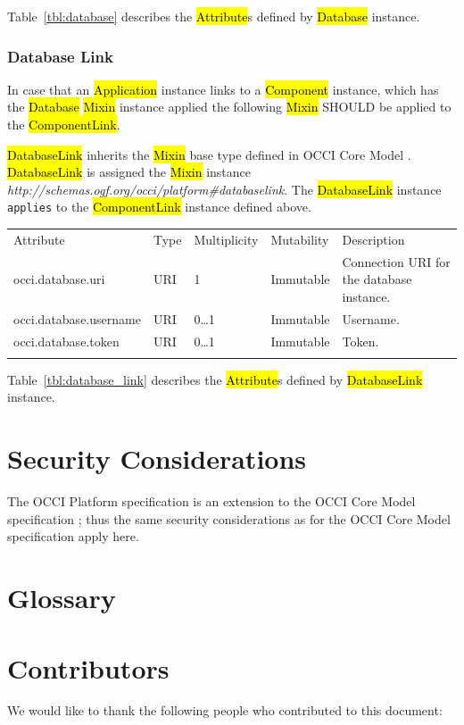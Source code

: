 \documentclass[10pt,a4paper]{article}
\begin{document}
Table~\ref{tbl:database} describes the \hl{Attribute}s defined by \hl{Database} instance.

\subsubsection{Database Link}
In case that an \hl{Application} instance links to a \hl{Component} instance, which has the \hl{Database} \hl{Mixin} instance applied the following \hl{Mixin} SHOULD be applied to the \hl{ComponentLink}.

\hl{DatabaseLink} inherits the \hl{Mixin} base type defined in OCCI Core Model \cite{occi:core}. \hl{DatabaseLink} is assigned the \hl{Mixin} instance \textit{http://schemas.ogf.org/occi/platform\#databaselink}. The \hl{DatabaseLink} instance \texttt{applies} to the \hl{ComponentLink} instance defined above.

{
	\begin{tabular}{lp{2.5cm}p{1cm}lp{5cm}}
	\toprule
	Attribute&Type&Multi\-plicity&Mutability&Description\\
	\colrule
	occi.database.uri & URI & 1 & Immutable & Connection URI for the database instance.\\
	occi.database.username & URI & 0\ldots1 & Immutable & Username.\\
	occi.database.token & URI & 0\ldots1 & Immutable & Token.\\
	\botrule
	\end{tabular}
}

Table~\ref{tbl:database_link} describes the \hl{Attribute}s defined by \hl{DatabaseLink} instance.


\section{Security Considerations}
The OCCI Platform specification is an extension to the OCCI Core
Model specification \cite{occi:core}; thus the same security
considerations as for the OCCI Core Model specification apply
here.

\section{Glossary}
\label{sec:glossary}


\section{Contributors}
We would like to thank the following people who contributed to this
document:
\end{document}
